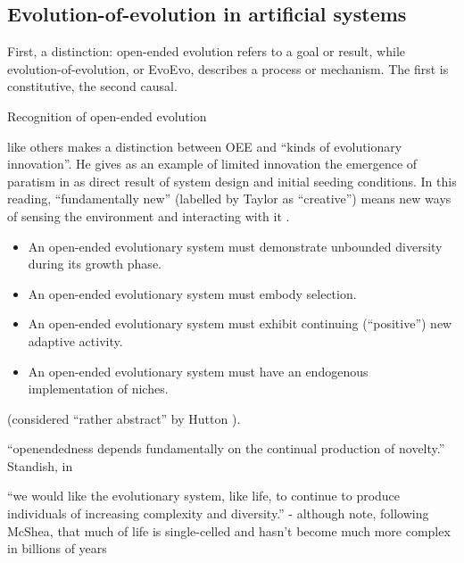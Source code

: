 \subsection{Evolution-of-evolution in artificial systems}

First, a distinction: open-ended evolution refers to a goal or result, while evolution-of-evolution, or EvoEvo, describes a process or mechanism. The first is constitutive, the second causal.

Recognition of open-ended evolution

\autocite{Taylor2001} like others makes a distinction between OEE and ``kinds of evolutionary innovation''. He gives as an example of limited innovation the emergence of paratism in \cite{Ray1977} as direct result of system design and initial seeding conditions. In this reading, ``fundamentally new'' (labelled by Taylor as ``creative'') means new ways of sensing the environment and interacting with it \cite{Taylor2001}.


\begin{itemize}
	\item An open-ended evolutionary system must demonstrate unbounded diversity during its growth phase.
	\item An open-ended evolutionary system must embody selection.
	\item An open-ended evolutionary system must exhibit continuing (``positive'') new adaptive activity.
	\item An open-ended evolutionary system must have an endogenous implementation of niches.
\end{itemize} \cite{Maley1999} (considered ``rather abstract'' by Hutton \parencite[p.341]{Hutton2002}).

``openendedness depends fundamentally on the continual production of novelty.'' Standish, in \autocite{Soros2014}


``we would like the evolutionary system, like life, to continue to produce individuals of increasing complexity and diversity.'' -
although note, following McShea, that much of life is single-celled and hasn't become much more complex in billions of years \autocite{Maley1999}

